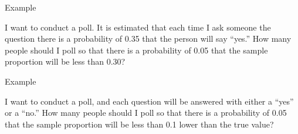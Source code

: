 \begin{frame}{Example}

  I want to conduct a poll. It is estimated that each time I ask
  someone the question there is a probability of 0.35 that the person
  will say ``yes.'' How many people should I poll so that there is a
  probability of 0.05 that the sample proportion will be less than
  0.30?

  \vfill


\end{frame}

\begin{frame}{Example}

  I want to conduct a poll, and each question will be answered with
  either a ``yes'' or a ``no.''  How many people should I poll so that
  there is a probability of 0.05 that the sample proportion will be
  less than 0.1 lower than the true value?

  \vfill



\end{frame}



